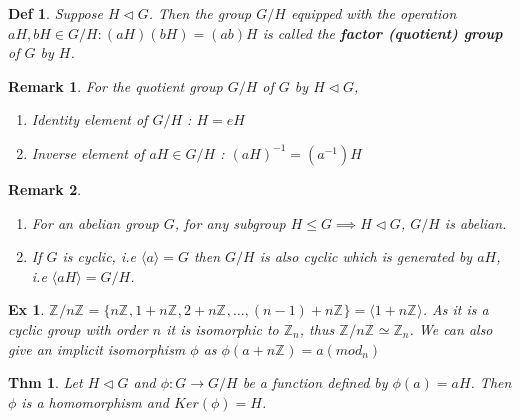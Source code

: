 \documentclass[paper=a4, fontsize=11pt]{scrartcl}
\newcommand{\Zn}[1]{\mathbb{Z}_{#1}}
\newcommand{\nextline}{$ $ \newline \vspace{-0.15in}}
\newtheorem{theorem}{Thm}
\newtheorem{definition}{Def}
\newtheorem{example}{Ex}
\newtheorem*{remark}{Remark}
\begin{document}
\vspace{0.15in}

\begin{definition}
	Suppose $H \triangleleft G$. Then the group $G/H$ equipped with the operation $aH , bH \in G/H : (aH)(bH)=(ab)H$ is called the \textbf{factor (quotient) group} of $G$ by $H$.
\end{definition}

\vspace{0.15in}

\begin{remark}
For the quotient group $G/H$ of $G$ by $H\triangleleft G$, 
\begin{enumerate}
	\item Identity element of $G/H$ : $H=eH$
	\item Inverse element of $aH \in G/H$ : $(aH)^{-1}=(a^{-1})H$
\end{enumerate}
\end{remark}

\vspace{0.15in}

\begin{remark}
	\nextline 
	\begin{enumerate}
		\item For an abelian group $G$, for any subgroup $H\leqslant G \implies H\triangleleft G$, $G/H$ is abelian.
		\item If $G$ is cyclic, i.e $\langle a\rangle = G$ then $G/H$ is also cyclic which is generated by $aH$, i.e $\langle aH \rangle = G/H$.
	\end{enumerate}
\end{remark}

\vspace{0.15in}

\begin{example}
	$\Zn{}/n\Zn{} = \{ n\Zn{} ,1 + n\Zn{} , 2+n\Zn{} ,\dots , (n-1)+n\Zn{} \} = \langle 1+ n\Zn{} \rangle$. As it is a cyclic group with order $n$ it is isomorphic to $\Zn{n}$, thus $\Zn{}/n\Zn{} \simeq \Zn{n}$. We can also give an implicit isomorphism $\phi$ as $\phi(a+n\Zn{}) = a (mod_n) $
\end{example}

\vspace{0.15in}

\begin{theorem}
	Let $H\triangleleft G$ and $\phi : G \to G/H$ be a function defined by $\phi(a)=aH$. Then $\phi$ is a homomorphism and $Ker(\phi)=H$.\\
\end{theorem}
\end{document}
